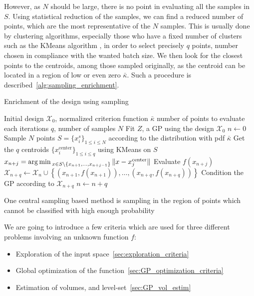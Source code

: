 \documentclass[../../Main_ManuscritThese.tex]{subfiles}
\begin{document}
However, as $N$ should be large, there is no point in evaluating all the samples in $S$. Using statistical reduction of the samples, we can find a reduced number of points, which are the most representative of the $N$ samples. This is usually done by clustering algorithms, especially those who have a fixed number of clusters such as the KMeans algorithm \cite{macqueen_methods_1967}, in order to select precisely $q$ points, number chosen in compliance with the wanted batch size. We then look for the closest points to the centroids, among those sampled originally, as the centroid can be located in a region of low or even zero $\bar{\kappa}$.
Such a procedure is described~\cref{alg:sampling_enrichment}.
\begin{algorithm}
  \caption{Enrichment of the design using sampling}
  \label{alg:sampling_enrichment}
\begin{algorithmic}
  \REQUIRE Initial design $\mathcal{X}_0$, normalized criterion function $\bar{\kappa}$
  \REQUIRE number of points to evaluate each iterations $q$, number of samples $N$
\STATE Fit $Z$, a GP using the design $\mathcal{X}_0$
\STATE $n \leftarrow 0$
\STATE Sample $N$ points $S = \{x^s_i\}_{1 \leq i \leq N}$ according to the distribution with pdf $\bar{\kappa}$
\STATE Get the $q$ centroids $\{x_i^{\mathrm{center}}\}_{1 \leq i \leq q}$ using KMeans on $S$
\STATE $x_{n+j}=\operatorname*{arg\,min \,}_{x \in S \setminus \{x_{n+1}, \dots, x_{n+j-1}\}} \|x - x_j^{\mathrm{center}} \|$
\ENDFOR
\STATE Evaluate $f(x_{n+j})$
\STATE $\mathcal{X}_{n+q} \leftarrow \mathcal{X}_n \cup \left\{\left(x_{n+1}, f(x_{n+1})\right),\dots,  \left(x_{n+q}, f(x_{n+q})\right)\right\}$
\STATE Condition the GP according to $\mathcal{X}_{n+q}$
\STATE $n \leftarrow n + q$
\ENDWHILE
\end{algorithmic}
\end{algorithm}
One central sampling based method is sampling in the region of points which cannot be classified with high enough probability

We are going to introduce a few criteria which are used for three different problems involving an unknown function $f$:
\begin{itemize}
\item Exploration of the input space~\cref{sec:exploration_criteria}
\item Global optimization of the function~\cref{sec:GP_optimization_criteria}
\item Estimation of volumes, and level-set~\cref{sec:GP_vol_estim} 
\end{itemize}
\end{document}

